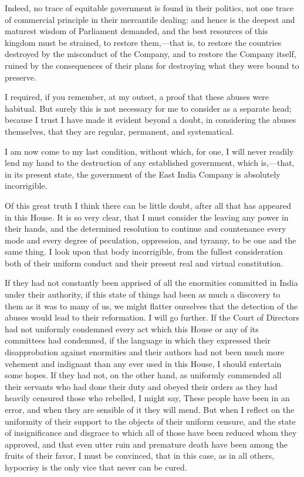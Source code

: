 Indeed, no trace of equitable government is found in their politics, not one trace of commercial principle in their mercantile dealing: and hence is the deepest and maturest wisdom of Parliament demanded, and the best resources of this kingdom must be strained, to restore them,—that is, to restore the countries destroyed by the misconduct of the Company, and to restore the Company itself, ruined by the consequences of their plans for destroying what they were bound to preserve.

I required, if you remember, at my outset, a proof that these abuses were habitual. But surely this is not necessary for me to consider as a separate head; because I trust I have made it evident beyond a doubt, in considering the abuses themselves, that they are regular, permanent, and systematical.

I am now come to my last condition, without which, for one, I will never readily lend my hand to the destruction of any established government, which is,—that, in its present state, the government of the East India Company is absolutely incorrigible.

Of this great truth I think there can be little doubt, after all that has appeared in this House. It is so very clear, that I must consider the leaving any power in their hands, and the determined resolution to continue and countenance every mode and every degree of peculation, oppression, and tyranny, to be one and the same thing. I look upon that body incorrigible, from the fullest consideration both of their uniform conduct and their present real and virtual constitution.

If they had not constantly been apprised of all the enormities committed in India under their authority, if this state of things had been as much a discovery to them as it was to many of us, we might flatter ourselves that the detection of the abuses would lead to their reformation. I will go further. If the Court of Directors had not uniformly condemned every act which this House or any of its committees had condemned, if the language in which they expressed their disapprobation against enormities and their authors had not been much more vehement and indignant than any ever used in this House, I should entertain some hopes. If they had not, on the other hand, as uniformly commended all their servants who had done their duty and obeyed their orders as they had heavily censured those who rebelled, I might say, These people have been in an error, and when they are sensible of it they will mend. But when I reflect on the uniformity of their support to the objects of their uniform censure, and the state of insignificance and disgrace to which all of those have been reduced whom they approved, and that even utter ruin and premature death have been among the fruits of their favor, I must be convinced, that in this case, as in all others, hypocrisy is the only vice that never can be cured.


